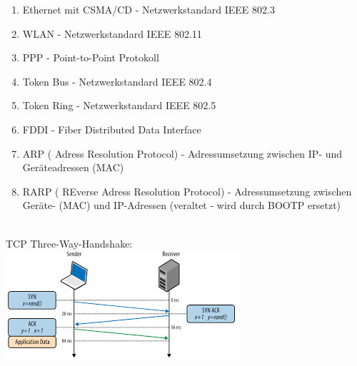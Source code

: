 \documentclass[11pt]{article}
\begin{document}
\begin{enumerate}
\begin{addmargin}[1em]{1em}
\begin{enumerate}
                \item Ethernet mit CSMA/CD - Netzwerkstandard IEEE 802.3\\

                \item WLAN - Netzwerkstandard IEEE 802.11\\

                \item PPP - Point-to-Point Protokoll\\

                \item Token Bus - Netzwerkstandard IEEE 802.4\\

                \item Token Ring - Netzwerkstandard IEEE 802.5\\

                \item FDDI - Fiber Distributed Data Interface\\

                \item ARP ( Adress Resolution Protocol) - Adressumsetzung zwischen IP- und Geräteadressen (MAC)\\

                \item RARP ( REverse Adress Resolution Protocol) - Adressumsetzung zwischen Geräte- (MAC) und IP-Adressen
                (veraltet - wird durch BOOTP ersetzt)\\\\

            \end{enumerate}

        \end{addmargin}
    \end{enumerate}

    TCP Three-Way-Handshake:
    \includegraphics{images.png}
\end{document}
